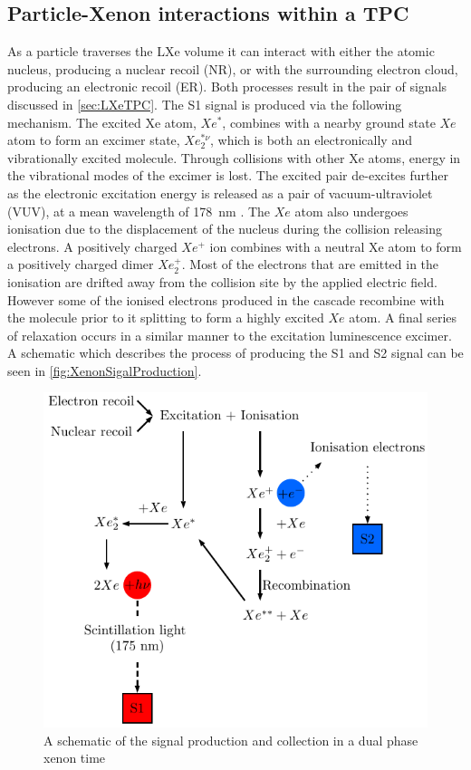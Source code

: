 \subsection{Particle-Xenon interactions within a TPC}
As a particle traverses the LXe volume it can interact with either the atomic nucleus, producing a nuclear recoil (NR), or with the surrounding electron cloud, producing an electronic recoil (ER). Both processes result in the pair of signals discussed in \autoref{sec:LXeTPC}. The S1 signal is produced via the following mechanism. The excited Xe atom, $Xe^{*}$, combines with a nearby ground state $Xe$ atom to form an excimer state, $Xe
_{2}^{*\nu}$, which is both an electronically and vibrationally excited molecule. Through collisions with other Xe atoms, energy in the vibrational modes of the excimer is lost. The excited pair de-excites further as the electronic excitation energy is released as a pair of vacuum-ultraviolet (VUV), at a mean wavelength of 178~nm \cite{Schumann:2014uva}.
The $Xe$ atom also undergoes ionisation due to the displacement of the nucleus during the collision releasing electrons. A positively charged $Xe^{+}$ ion combines with a neutral Xe atom to form a positively charged dimer $Xe^{+}_{2}$. Most of the electrons that are emitted in the ionisation are drifted away from the collision site by the applied electric field. However some of the ionised electrons produced in the cascade recombine with the molecule prior to it splitting to form a highly excited $Xe$ atom. A final series of relaxation occurs in a similar manner to the excitation luminescence excimer. A schematic which describes the process of producing the S1 and S2 signal can be seen in \autoref{fig:XenonSigalProduction}.
\begin{figure}
    \centering
    \includegraphics[width=0.6\linewidth]{figures/LZ/Xenon_interaction.pdf}
    \caption{A schematic of the signal production and collection in a dual phase xenon time}
    \label{fig:XenonSigalProduction}
\end{figure}

